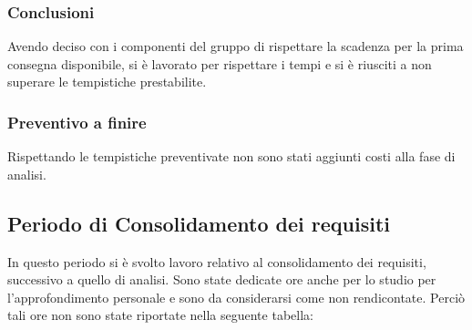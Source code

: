        \subsubsection{Conclusioni}
        Avendo deciso con i componenti del gruppo di rispettare la scadenza per la prima consegna disponibile, si è lavorato per rispettare i tempi e si è riusciti a non superare le tempistiche prestabilite.

        \subsubsection{Preventivo a finire}
        Rispettando le tempistiche preventivate non sono stati aggiunti costi alla fase di analisi.

    \newpage
    \subsection{Periodo di Consolidamento dei requisiti}
        In questo periodo si è svolto lavoro relativo al consolidamento dei requisiti, successivo a quello di analisi. Sono state dedicate ore anche per lo studio per l'approfondimento personale e sono da considerarsi come non rendicontate. Perciò tali ore non sono state riportate nella seguente tabella:

